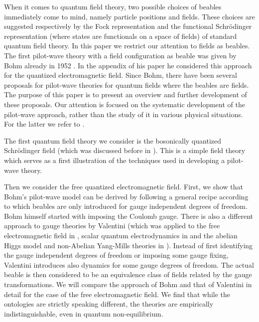 \documentclass[12pt]{article}
\begin{document}
When it comes to quantum field theory, two possible choices of beables immediately come to mind, namely particle positions and fields. These choices are suggested respectively by the Fock representation and the functional Schr\"odinger representation (where states are functionals on a space of fields) of standard quantum field theory. In this paper we restrict our attention to fields as beables. The first pilot-wave theory with a field configuration as beable was given by Bohm already in 1952 \cite{bohm52b}. In the appendix of his paper he considered this approach for the quantized electromagnetic field. Since Bohm, there have been several proposals for pilot-wave theories for quantum fields where the beables are fields. The purpose of this paper is to present an overview and further development of these proposals. Our attention is focused on the systematic development of the pilot-wave approach, rather than the study of it in various physical situations. For the latter we refer to  \cite{kaloyerou85,kaloyerou94,kaloyerou96,kaloyerou00,kaloyerou03,kaloyerou05,bohm87b,bohm93,holland93b,holland93a,lam941,lam942}.

The first quantum field theory we consider is the bosonically quantized Schr{\"o}\-ding\-er field (which was discussed before in \cite{takabayasi52,holland881,holland93b}). This is a simple field theory which serves as a first illustration of the techniques used in developing a pilot-wave theory. 

Then we consider the free quantized electromagnetic field. First, we show that Bohm's pilot-wave model can be derived by following a general recipe according to which beables are only introduced for gauge independent degrees of freedom. Bohm himself started with imposing the Coulomb gauge. There is also a different approach to gauge theories by Valentini (which was applied to the free electromagnetic field in \cite{valentini92,valentini96}, scalar quantum electrodynamics in \cite{valentini96} and the abelian Higgs model and non-Abelian Yang-Mills theories in \cite{valentini09}). Instead of first identifying the gauge independent degrees of freedom or imposing some gauge fixing, Valentini introduces also dynamics for some gauge degrees of freedom. The actual beable is then considered to be an equivalence class of fields related by the gauge transformations. We will compare the approach of Bohm and that of Valentini in detail for the case of the free electromagnetic field. We find that while the ontologies are strictly speaking different, the theories are empirically indistinguishable, even in quantum non-equilibrium.
\end{document}
